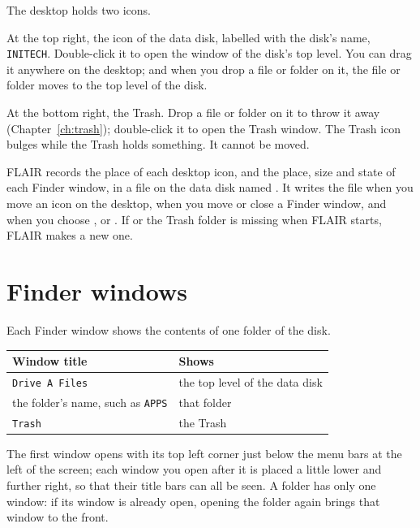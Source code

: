 The desktop holds two icons.

At the top right, the icon of the data disk,
labelled with the disk's name, \texttt{INITECH}.  Double-click it to open
the window of the disk's top level.  You can drag it anywhere on the
desktop; and when you drop a file or folder on it, the file or folder moves
to the top level of the disk.

At the bottom right, the Trash.  Drop a file or folder
on it to throw it away (Chapter~\ref{ch:trash}); double-click it to open the Trash
window.  The Trash icon bulges while the Trash holds something.  It cannot
be moved.


FLAIR records the place of each desktop icon, and the place, size and
state of each Finder window, in a file on the data disk named
.  It writes the file when you move an icon on the
desktop, when you move or close a Finder window, and when you choose
,  or .
If  or the Trash folder is missing when FLAIR starts,
FLAIR makes a new one.

\section{Finder windows}
Each Finder window shows the contents of one folder of the disk.

\begin{center}\small
\begin{tabular}{@{}ll@{}}
\textbf{Window title} & \textbf{Shows}\\\hline
\texttt{Drive A Files} & the top level of the data disk\\
the folder's name, such as \texttt{APPS} & that folder\\
\texttt{Trash} & the Trash\\
\end{tabular}
\end{center}

The first window opens with its top left corner just below the menu bars at
the left of the screen; each window you open after it is placed a little
lower and further right, so that their title bars can all be seen.  A
folder has only one window: if its window is already open, opening the
folder again brings that window to the front.

